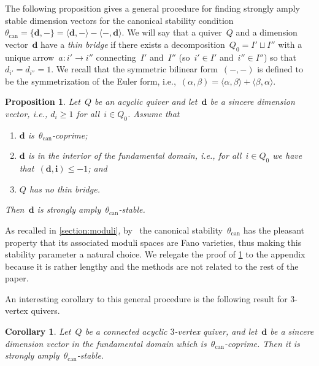 \documentclass[11pt]{article}
\theoremstyle{plain}
\newtheorem{corollary}[theorem]{Corollary}
\newtheorem{proposition}[theorem]{Proposition}
\theoremstyle{definition}
\newcommand\can{\ensuremath{\mathrm{can}}}
\newcommand\tuple[1]{\ensuremath{{\boldsymbol{#1}}}}
\begin{document}
The following proposition gives a general procedure for
finding strongly amply stable dimension vectors
for the canonical stability condition~$\theta_\can=\{\tuple{d},-\}=\langle\tuple{d},-\rangle-\langle-,\tuple{d}\rangle$.
We will say that a quiver~$Q$ and a dimension vector~$\tuple{d}$
have a \emph{thin bridge}
if there exists a decomposition~$Q_0=I'\sqcup I''$
with a unique arrow~$a\colon i'\to i''$ connecting~$I'$ and~$I''$
(so~$i'\in I'$ and~$i''\in I''$)
so that~$d_{i'}=d_{i''}=1$.
We recall that the symmetric bilinear form~$(-,-)$ is defined to be
the symmetrization of the Euler form, i.e.,~$(\alpha,\beta) = \langle \alpha , \beta\rangle + \langle \beta,\alpha\rangle$.
\begin{proposition}
\label{proposition:strong-ample-stability-fundamental-domain}
Let~$Q$ be an acyclic quiver
and let~$\tuple{d}$ be a sincere dimension vector,
i.e., $d_i\geq 1$ for all~$i\in Q_0$.
Assume that
\begin{enumerate}
\item $\tuple{d}$ is~$\theta_\can$-coprime;
\item $\tuple{d}$ is in the interior of the fundamental domain,
i.e., for all~$i\in Q_0$ we have that~$(\tuple{d},\tuple{i})\leq -1$; and
\item $Q$ has no thin bridge.
\end{enumerate}
Then~$\tuple{d}$ is strongly amply~$\theta_\can$-stable.
\end{proposition}
As recalled in \cref{section:moduli}, by~\cite{MR4352662}
the canonical stability~$\theta_\can$ has the pleasant property
that its associated moduli spaces are Fano varieties,
thus making this stability parameter a natural choice.
We relegate the proof of \cref{proposition:strong-ample-stability-fundamental-domain}
to the appendix because it is rather lengthy
and the methods are not related to the rest of the paper.

An interesting corollary to this general procedure is the following result for $3$-vertex quivers.

\begin{corollary}
\label{corollary:hans}
Let~$Q$ be a connected acyclic $3$-vertex quiver,
and let~$\tuple{d}$ be a sincere dimension vector in the fundamental domain
which is~$\theta_\can$-coprime.
Then it is strongly amply~$\theta_\can$-stable.
\end{corollary}
\end{document}
